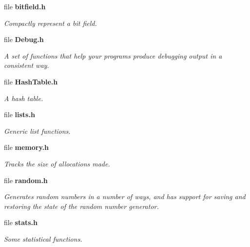\begin{CompactItemize}
\item 
file {\bf bitfield.h}
\begin{CompactList}\small\item\em Compactly represent a bit field. \item\end{CompactList}

\item 
file {\bf Debug.h}
\begin{CompactList}\small\item\em A set of functions that help your programs produce debugging output in a consistent way. \item\end{CompactList}

\item 
file {\bf Hash\-Table.h}
\begin{CompactList}\small\item\em A hash table. \item\end{CompactList}

\item 
file {\bf lists.h}
\begin{CompactList}\small\item\em Generic list functions. \item\end{CompactList}

\item 
file {\bf memory.h}
\begin{CompactList}\small\item\em Tracks the size of allocations made. \item\end{CompactList}

\item 
file {\bf random.h}
\begin{CompactList}\small\item\em Generates random numbers in a number of ways, and has support for saving and restoring the state of the random number generator. \item\end{CompactList}

\item 
file {\bf stats.h}
\begin{CompactList}\small\item\em Some statistical functions. \item\end{CompactList}

\end{CompactItemize}
